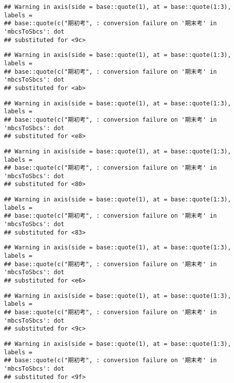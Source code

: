 \documentclass[
]{book}
\begin{document}
\begin{verbatim}
## Warning in axis(side = base::quote(1), at = base::quote(1:3), labels =
## base::quote(c("期初考", : conversion failure on '期末考' in 'mbcsToSbcs': dot
## substituted for <9c>
\end{verbatim}

\begin{verbatim}
## Warning in axis(side = base::quote(1), at = base::quote(1:3), labels =
## base::quote(c("期初考", : conversion failure on '期末考' in 'mbcsToSbcs': dot
## substituted for <ab>
\end{verbatim}

\begin{verbatim}
## Warning in axis(side = base::quote(1), at = base::quote(1:3), labels =
## base::quote(c("期初考", : conversion failure on '期末考' in 'mbcsToSbcs': dot
## substituted for <e8>
\end{verbatim}

\begin{verbatim}
## Warning in axis(side = base::quote(1), at = base::quote(1:3), labels =
## base::quote(c("期初考", : conversion failure on '期末考' in 'mbcsToSbcs': dot
## substituted for <80>
\end{verbatim}

\begin{verbatim}
## Warning in axis(side = base::quote(1), at = base::quote(1:3), labels =
## base::quote(c("期初考", : conversion failure on '期末考' in 'mbcsToSbcs': dot
## substituted for <83>
\end{verbatim}

\begin{verbatim}
## Warning in axis(side = base::quote(1), at = base::quote(1:3), labels =
## base::quote(c("期初考", : conversion failure on '期末考' in 'mbcsToSbcs': dot
## substituted for <e6>
\end{verbatim}

\begin{verbatim}
## Warning in axis(side = base::quote(1), at = base::quote(1:3), labels =
## base::quote(c("期初考", : conversion failure on '期末考' in 'mbcsToSbcs': dot
## substituted for <9c>
\end{verbatim}

\begin{verbatim}
## Warning in axis(side = base::quote(1), at = base::quote(1:3), labels =
## base::quote(c("期初考", : conversion failure on '期末考' in 'mbcsToSbcs': dot
## substituted for <9f>
\end{verbatim}
\end{document}
